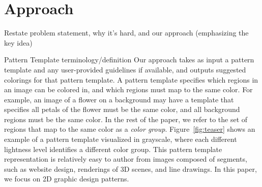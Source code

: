 \section{Approach}
\label{sec:approach}


Restate problem statement, why it's hard, and our approach (emphasizing the key idea)~

Pattern Template terminology/definition
Our approach takes as input a pattern template and any user-provided guidelines if available, and outputs suggested colorings for that pattern template. A pattern template specifies which regions in an image can be colored in, and which regions must map to the same color. For example, an image of a flower on a background may have a template that specifies all petals of the flower must be the same color, and all background regions must be the same color. In the rest of the paper, we refer to the set of regions that map to the same color as a \emph{color group}. Figure~\ref{fig:teaser} shows an example of a pattern template visualized in grayscale, where each different lightness level identifies a different color group. This pattern template representation is relatively easy to author from images composed of segments, such as website design, renderings of 3D scenes, and line drawings. In this paper, we focus on 2D graphic design patterns. 




